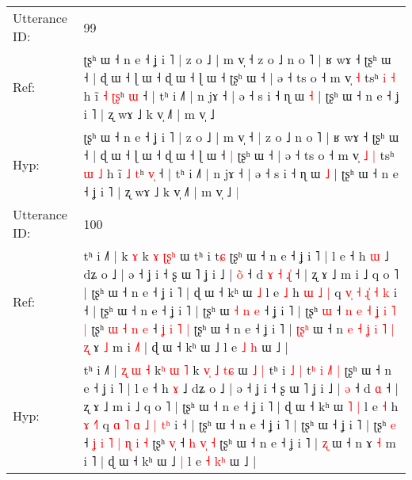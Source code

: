 \documentclass[10pt]{article}
\DeclareRobustCommand{\hl}[1]{{\textcolor{red}{#1}}}
\begin{document}
\begin{longtable}{ll}
 \\
\midrule
Utterance ID: & 99 \\
Ref: & ʈʂʰ ɯ ˧ n e ˧ ʝ i ˥ | z o ˩ | m v̩ ˧\hl{}\hl{} z o ˩ n o ˥ | ʁ wɤ ˧ ʈʂʰ ɯ ˧ | ɖ ɯ ˧ ɭ ɯ ˧ ɖ ɯ ˧ ɭ ɯ ˧\hl{}\hl{} ʈʂʰ ɯ ˧ | ə ˧ ts o ˧ m v̩\hl{}\hl{} \hl{˧} tsʰ \hl{i} \hl{˧} h ĩ \hl{˧} \hl{ʈ}\hl{ʂ}ʰ \hl{}\hl{ɯ} ˧ | tʰ i ˩˥ | n jɤ ˧ | ə ˧ s i ˧ ɳ ɯ \hl{˧} | ʈʂʰ ɯ ˧ n e ˧ ʝ i ˥ | ʐ wɤ ˩ k v̩ ˩˥ | m v̩ ˩\hl{}\hl{}
 \\
Hyp: & ʈʂʰ ɯ ˧ n e ˧ ʝ i ˥ | z o ˩ | m v̩ ˧\hl{ }\hl{|} z o ˩ n o ˥ | ʁ wɤ ˧ ʈʂʰ ɯ ˧ | ɖ ɯ ˧ ɭ ɯ ˧ ɖ ɯ ˧ ɭ ɯ ˧\hl{ }\hl{|} ʈʂʰ ɯ ˧ | ə ˧ ts o ˧ m v̩\hl{ }\hl{˩} \hl{|} tsʰ \hl{ɯ} \hl{˩} h ĩ \hl{˩} \hl{}\hl{t}ʰ \hl{v}\hl{̩} ˧ | tʰ i ˩˥ | n jɤ ˧ | ə ˧ s i ˧ ɳ ɯ \hl{˩} | ʈʂʰ ɯ ˧ n e ˧ ʝ i ˥ | ʐ wɤ ˩ k v̩ ˩˥ | m v̩ ˩\hl{ }\hl{|}
 \\
\midrule
Utterance ID: & 100 \\
Ref: & tʰ i ˩˥ |\hl{}\hl{}\hl{}\hl{}\hl{}\hl{} k\hl{}\hl{}\hl{} \hl{ɤ} k \hl{}\hl{ɤ} \hl{}\hl{ʈ}\hl{ʂ}\hl{ʰ} ɯ\hl{}\hl{}\hl{}\hl{} tʰ i\hl{}\hl{}\hl{}\hl{} t\hl{}\hl{}\hl{}\hl{}\hl{}\hl{}\hl{}\hl{ɕ} ʈʂʰ ɯ ˧ n e ˧ ʝ i ˥ | l e ˧ h \hl{ɯ} ˩ dʑ o ˩ | ə ˧ ʝ i ˧ ʂ ɯ ˥ ʝ i ˩ | \hl{o}\hl{̃} ˧ d\hl{ }\hl{ɤ}\hl{ }\hl{˧} \hl{ɻ}\hl{̍} ˧ | ʐ ɤ ˩ m i ˩ q o ˥ | ʈʂʰ ɯ ˧ n e ˧ ʝ i ˥ | ɖ ɯ ˧ kʰ ɯ\hl{}\hl{} \hl{˩} l e \hl{˩} h \hl{ɯ} \hl{˩}\hl{ }\hl{|} q \hl{v}\hl{̩} \hl{˧} \hl{}\hl{ɻ}\hl{̍} \hl{˧} \hl{}\hl{k} i ˧ | ʈʂʰ ɯ ˧ n e ˧ ʝ i ˥ | ʈʂʰ ɯ\hl{ }\hl{˧}\hl{ }\hl{n}\hl{ }\hl{e} ˧ ʝ i ˥ | ʈʂʰ \hl{ɯ} ˧ \hl{n} \hl{e} \hl{˧} \hl{ʝ} \hl{i} \hl{˥} \hl{|} ʈʂʰ\hl{ }\hl{ɯ}\hl{ }\hl{˧} \hl{n}\hl{ }\hl{e} ˧ \hl{ʝ} \hl{i}\hl{ }\hl{˥} \hl{|} ʈʂʰ ɯ ˧ n e ˧ ʝ i ˥ | \hl{ʈ}\hl{ʂ}\hl{ʰ} ɯ ˧ n\hl{ }\hl{e}\hl{ }\hl{˧}\hl{ }\hl{ʝ}\hl{ }\hl{i}\hl{ }\hl{˥}\hl{ }\hl{|}\hl{ }\hl{ʐ} ɤ \hl{˩} m i \hl{˩}˥ | ɖ ɯ ˧ kʰ ɯ ˩\hl{}\hl{} l e \hl{˩} \hl{}\hl{h} ɯ ˩ |
 \\
Hyp: & tʰ i ˩˥ |\hl{ }\hl{ʐ}\hl{ }\hl{ɯ}\hl{ }\hl{˧} k\hl{ʰ}\hl{ }\hl{ɯ} \hl{˥} k \hl{v}\hl{̩} \hl{˩}\hl{ }\hl{t}\hl{ɕ} ɯ\hl{ }\hl{˩}\hl{ }\hl{|} tʰ i\hl{ }\hl{˩}\hl{ }\hl{|} t\hl{ʰ}\hl{ }\hl{i}\hl{ }\hl{˩}\hl{˥}\hl{ }\hl{|} ʈʂʰ ɯ ˧ n e ˧ ʝ i ˥ | l e ˧ h \hl{ɤ} ˩ dʑ o ˩ | ə ˧ ʝ i ˧ ʂ ɯ ˥ ʝ i ˩ | \hl{}\hl{ə} ˧ d\hl{}\hl{}\hl{}\hl{} \hl{}\hl{ɑ} ˧ | ʐ ɤ ˩ m i ˩ q o ˥ | ʈʂʰ ɯ ˧ n e ˧ ʝ i ˥ | ɖ ɯ ˧ kʰ ɯ\hl{ }\hl{˥} \hl{|} l e \hl{˧} h \hl{ɤ} \hl{}\hl{˧}\hl{˥} q \hl{}\hl{ɑ} \hl{˥} \hl{ɑ}\hl{ }\hl{˩} \hl{|} \hl{t}\hl{ʰ} i ˧ | ʈʂʰ ɯ ˧ n e ˧ ʝ i ˥ | ʈʂʰ ɯ\hl{}\hl{}\hl{}\hl{}\hl{}\hl{} ˧ ʝ i ˥ | ʈʂʰ \hl{e} ˧ \hl{ʝ} \hl{i} \hl{˥} \hl{|} \hl{ɳ} \hl{i} \hl{˧} ʈʂʰ\hl{}\hl{}\hl{}\hl{} \hl{}\hl{v}\hl{̩} ˧ \hl{h} \hl{}\hl{v}\hl{̩} \hl{˧} ʈʂʰ ɯ ˧ n e ˧ ʝ i ˥ | \hl{}\hl{}\hl{ʐ} ɯ ˧ n\hl{}\hl{}\hl{}\hl{}\hl{}\hl{}\hl{}\hl{}\hl{}\hl{}\hl{}\hl{}\hl{}\hl{} ɤ \hl{˧} m i \hl{}˥ | ɖ ɯ ˧ kʰ ɯ ˩\hl{ }\hl{|} l e \hl{˧} \hl{k}\hl{ʰ} ɯ ˩ |

\end{longtable}
\end{document}
